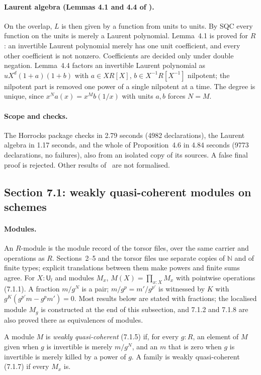 \documentclass[11pt]{article}
\newcommand{\U}{\mathsf{U}}
\theoremstyle{remark}
\begin{document}
\paragraph{Laurent algebra (Lemmas 4.1 and 4.4 of \cite{Proj}).} On the
overlap, $L$ is then given by a function from units to units. By SQC
every function on the units is merely a Laurent polynomial. Lemma~4.1
is proved for $R$: an invertible Laurent polynomial merely has one unit
coefficient, and every other coefficient is not nonzero. Coefficients are
decided only under double negation. Lemma~4.4 factors an invertible Laurent polynomial as
$uX^d(1+a)(1+b)$ with $a\in XR[X]$, $b\in X^{-1}R[X^{-1}]$ nilpotent; the
nilpotent part is removed one power of a single nilpotent at a time.
The degree is unique, since $x^Na(x)=x^Mb(1/x)$ with units $a,b$ forces
$N=M$.

\paragraph{Scope and checks.} The Horrocks package checks in 2.79
seconds (4982 declarations), the Laurent algebra in 1.17 seconds, and
the whole of Proposition~4.6 in 4.84 seconds (9773 declarations, no
failures), also from an isolated copy of its sources. A false final proof
is rejected. Other results of~\cite{Proj} are not formalised.

\subsection*{Section 7.1: weakly quasi-coherent modules on schemes}

\paragraph{Modules.} An $R$-module is the module record of the torsor
files, over the same carrier and operations as $R$. Sections~2--5 and
the torsor files use separate copies of $\mathbb N$ and of finite types;
explicit translations between them make powers and finite sums agree.
For $X:\U_l$ and modules $M_x$, $M(X)=\prod_{x:X}M_x$ with pointwise
operations (7.1.1). A fraction $m/g^N$ is a pair; $m/g^p=m'/g^{p'}$ is
witnessed by $K$ with $g^K(g^{p'}m-g^pm')=0$. Most results below are
stated with fractions; the localised module $M_g$ is constructed at the
end of this subsection, and 7.1.2 and 7.1.8 are also proved there as
equivalences of modules.

A module $M$ is \emph{weakly quasi-coherent} (7.1.5) if, for every
$g:R$, an element of $M$ given when $g$ is invertible is merely $m/g^N$,
and an $m$ that is zero when $g$ is invertible is merely killed by a
power of $g$. A family is weakly quasi-coherent (7.1.7) if every $M_x$ is.
\end{document}
